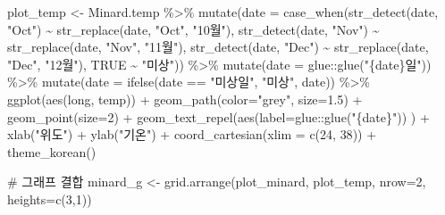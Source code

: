 \documentclass[
  letterpaper,
  chapter,a4paper,showtrims,openright,hidelinks]{oblivoir}
\newenvironment{Shaded}{\begin{snugshade}}{\end{snugshade}}
\newcommand{\AttributeTok}[1]{\textcolor[rgb]{0.40,0.45,0.13}{#1}}
\newcommand{\CommentTok}[1]{\textcolor[rgb]{0.37,0.37,0.37}{#1}}
\newcommand{\ConstantTok}[1]{\textcolor[rgb]{0.56,0.35,0.01}{#1}}
\newcommand{\DecValTok}[1]{\textcolor[rgb]{0.68,0.00,0.00}{#1}}
\newcommand{\FloatTok}[1]{\textcolor[rgb]{0.68,0.00,0.00}{#1}}
\newcommand{\FunctionTok}[1]{\textcolor[rgb]{0.28,0.35,0.67}{#1}}
\newcommand{\NormalTok}[1]{\textcolor[rgb]{0.00,0.23,0.31}{#1}}
\newcommand{\OtherTok}[1]{\textcolor[rgb]{0.00,0.23,0.31}{#1}}
\newcommand{\SpecialCharTok}[1]{\textcolor[rgb]{0.37,0.37,0.37}{#1}}
\newcommand{\StringTok}[1]{\textcolor[rgb]{0.13,0.47,0.30}{#1}}
\begin{document}
\begin{Shaded}
\begin{Highlighting}[]
\NormalTok{plot\_temp }\OtherTok{\textless{}{-}}\NormalTok{ Minard.temp }\SpecialCharTok{\%\textgreater{}\%} 
  \FunctionTok{mutate}\NormalTok{(}\AttributeTok{date =} \FunctionTok{case\_when}\NormalTok{(}\FunctionTok{str\_detect}\NormalTok{(date, }\StringTok{"Oct"}\NormalTok{) }\SpecialCharTok{\textasciitilde{}} \FunctionTok{str\_replace}\NormalTok{(date, }\StringTok{"Oct"}\NormalTok{, }\StringTok{"10월"}\NormalTok{),}
                          \FunctionTok{str\_detect}\NormalTok{(date, }\StringTok{"Nov"}\NormalTok{) }\SpecialCharTok{\textasciitilde{}} \FunctionTok{str\_replace}\NormalTok{(date, }\StringTok{"Nov"}\NormalTok{, }\StringTok{"11월"}\NormalTok{),}
                          \FunctionTok{str\_detect}\NormalTok{(date, }\StringTok{"Dec"}\NormalTok{) }\SpecialCharTok{\textasciitilde{}} \FunctionTok{str\_replace}\NormalTok{(date, }\StringTok{"Dec"}\NormalTok{, }\StringTok{"12월"}\NormalTok{),}
                           \ConstantTok{TRUE} \SpecialCharTok{\textasciitilde{}} \StringTok{"미상"}\NormalTok{)) }\SpecialCharTok{\%\textgreater{}\%} 
  \FunctionTok{mutate}\NormalTok{(}\AttributeTok{date =}\NormalTok{ glue}\SpecialCharTok{::}\FunctionTok{glue}\NormalTok{(}\StringTok{"\{date\}일"}\NormalTok{)) }\SpecialCharTok{\%\textgreater{}\%} 
  \FunctionTok{mutate}\NormalTok{(}\AttributeTok{date =} \FunctionTok{ifelse}\NormalTok{(date }\SpecialCharTok{==} \StringTok{"미상일"}\NormalTok{, }\StringTok{"미상"}\NormalTok{, date)) }\SpecialCharTok{\%\textgreater{}\%} 
  \FunctionTok{ggplot}\NormalTok{(}\FunctionTok{aes}\NormalTok{(long, temp)) }\SpecialCharTok{+}
    \FunctionTok{geom\_path}\NormalTok{(}\AttributeTok{color=}\StringTok{"grey"}\NormalTok{, }\AttributeTok{size=}\FloatTok{1.5}\NormalTok{) }\SpecialCharTok{+}
    \FunctionTok{geom\_point}\NormalTok{(}\AttributeTok{size=}\DecValTok{2}\NormalTok{) }\SpecialCharTok{+}
    \FunctionTok{geom\_text\_repel}\NormalTok{(}\FunctionTok{aes}\NormalTok{(}\AttributeTok{label=}\NormalTok{glue}\SpecialCharTok{::}\FunctionTok{glue}\NormalTok{(}\StringTok{"\{date\}"}\NormalTok{)) ) }\SpecialCharTok{+}
    \FunctionTok{xlab}\NormalTok{(}\StringTok{"위도"}\NormalTok{) }\SpecialCharTok{+} \FunctionTok{ylab}\NormalTok{(}\StringTok{"기온"}\NormalTok{) }\SpecialCharTok{+}
    \FunctionTok{coord\_cartesian}\NormalTok{(}\AttributeTok{xlim =} \FunctionTok{c}\NormalTok{(}\DecValTok{24}\NormalTok{, }\DecValTok{38}\NormalTok{)) }\SpecialCharTok{+} 
    \FunctionTok{theme\_korean}\NormalTok{()}
    
\CommentTok{\# 그래프 결합}
\NormalTok{minard\_g }\OtherTok{\textless{}{-}} \FunctionTok{grid.arrange}\NormalTok{(plot\_minard, plot\_temp, }\AttributeTok{nrow=}\DecValTok{2}\NormalTok{, }\AttributeTok{heights=}\FunctionTok{c}\NormalTok{(}\DecValTok{3}\NormalTok{,}\DecValTok{1}\NormalTok{))}


\end{Highlighting}
\end{Shaded}
\end{document}

